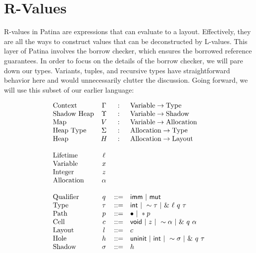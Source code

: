 \section*{R-Values}

R-values in Patina are expressions that can evaluate to a layout.
Effectively, they are all the ways to construct values that can be deconstructed by L-values.
This layer of Patina involves the borrow checker, which ensures the borrowed reference guarantees.
In order to focus on the details of the borrow checker, we will pare down our types.
Variants, tuples, and recursive types have straightforward behavior here 
and would unnecessarily clutter the discussion.
Going forward, we will use this subset of our earlier language:

\[
\begin{array}{lccl}
\textrm{Context}  & \Gamma & : & \textrm{Variable} \rightarrow \textrm{Type} \\
\textrm{Shadow Heap} & \Upsilon & : & \textrm{Variable} \rightarrow \textrm{Shadow} \\
\textrm{Map} & V   & : & \textrm{Variable} \rightarrow \textrm{Allocation} \\
\textrm{Heap Type} & \Sigma & : & \textrm{Allocation} \rightarrow \textrm{Type} \\
\textrm{Heap} & H   & : & \textrm{Allocation} \rightarrow \textrm{Layout} \\
& & & \\
\textrm{Lifetime} & \ell & & \\
\textrm{Variable} & x & & \\
\textrm{Integer} & z & & \\
\textrm{Allocation} & \alpha & & \\
& & & \\
\textrm{Qualifier} & q & ::= & \mathsf{imm} ~|~ \mathsf{mut} \\
\textrm{Type} & \tau & ::= & \mathsf{int} ~|~ \sim{\tau} ~|~ \&~{{\ell}~{q}~{\tau}} \\
\textrm{Path} & p & ::= & \bullet ~|~ *{p} \\
\textrm{Cell} & c & ::= & \mathsf{void} ~|~ z ~|~ \sim{\alpha} ~|~ \&~{{q}~{\alpha}} \\
\textrm{Layout} & l & ::= & c \\
\textrm{Hole} & h & ::= & \mathsf{uninit} ~|~ \mathsf{int} ~|~ \sim{\sigma} ~|~ \&~{{q}~{\tau}} \\
\textrm{Shadow} & \sigma & ::= & h \\
\end{array}
\]

